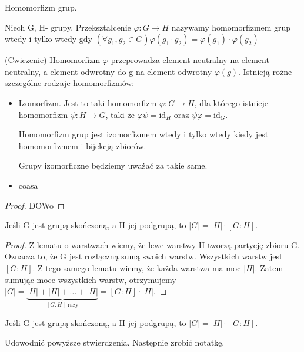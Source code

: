 \begin{definition}{Homomorfizm grup.}

	Niech G, H- grupy.
	Przekształcenie $\varphi: G \rightarrow H$ nazywamy homomorfizmem grup wtedy i tylko wtedy gdy $\left( \forall g_1, g_2 \in G \right) \varphi(g_1\cdot g_2) = \varphi(g_1)\cdot \varphi(g_2)$
\end{definition}

(Cwiczenie) Homomorfizm $\varphi$ przeprowadza element neutralny na element neutralny, a element odwrotny do g na element odwrotny $\varphi(g)$.
Istnieją rożne szczególne rodzaje homomorfizmów:

\begin{itemize}
	\item Izomorfizm. Jest to taki homomorfizm $\varphi: G \rightarrow H$, dla którego istnieje homomorfizm $\psi : H \rightarrow G$, taki że $\varphi\psi = \text{id}_{H}$ oraz $\psi\varphi = \text{id}_{G}$.
		\begin{remark}

			Homomorfizm grup jest izomorfizmem wtedy i tylko wtedy kiedy jest homomorfizmem i bijekcją zbiorów.
		\end{remark}
		Grupy izomorficzne będziemy uważać za takie same.
	\item coasa
\end{itemize}
\begin{proof}

	DOWo
	\lipsum[1]
\end{proof}


\lipsum[2]


\begin{theorem}[Lagrange'a]
    Jeśli G jest grupą skończoną, a H jej podgrupą, to $|G| = |H| \cdot [G:H]$.
\end{theorem}
\begin{proof}
	Z lematu o warstwach wiemy, że lewe warstwy H tworzą partycję zbioru G. Oznacza to, że G jest rozłączną sumą swoich warstw. Wszystkich warstw jest $[G:H]$. Z tego samego lematu wiemy, że każda warstwa ma moc $|H|$. Zatem sumując moce wszystkich warstw, otrzymujemy $|G| = \underbrace{|H| + |H| + \dots + |H|}_{[G:H] \text{ razy}} = [G:H] \cdot |H|$.
\end{proof}

\lipsum[2]

\begin{eg}
    Jeśli G jest grupą skończoną, a H jej podgrupą, to $|G| = |H| \cdot [G:H]$.
\end{eg}

\lipsum[1]

\begin{note}[Notatka]

	\lipsum[1]
\end{note}
\lipsum[2]
\begin{remark}
	\lipsum[1]	
\end{remark}
\lipsum[3]
\begin{corollary}
	\lipsum[1]	
\end{corollary}
\begin{ex}

	Udowodnić powyższe stwierdzenia. Następnie zrobić notatkę.
\end{ex}

